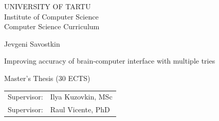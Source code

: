 \documentclass[12pt]{article}
\begin{document}
\thispagestyle{empty}
\begin{center}

\large
UNIVERSITY OF TARTU\\[2mm]
Institute of Computer Science\\
Computer Science Curriculum\\[2mm]

\vspace{25mm}

\Large Jevgeni Savostkin

\vspace{4mm}

\huge Improving accuracy of brain-computer interface with multiple tries

\vspace{20mm}

\Large Master's Thesis (30 ECTS)

\end{center}

\vspace{2mm}

\begin{flushright}
 {
 \setlength{\extrarowheight}{5pt}
 \begin{tabular}{r l} 
  \sffamily Supervisor: & \sffamily Ilya Kuzovkin, MSc \\ 
  \sffamily Supervisor: & \sffamily Raul Vicente, PhD 
 \end{tabular}
 }
\end{flushright}

\vspace{10mm}

\vspace{2mm}



\vspace{2mm}


\vspace{8mm}
\end{document}
